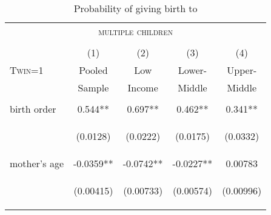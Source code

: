 \documentclass{article}[11pt,subeqn]
\begin{document}
\begin{spacing}{1.5}
\begin{table}[ht]
\caption{Probability of giving birth to}
\vspace{-7mm}
\label{tab:twinreg1}
\begin{center}
\begin{tabular}{lcccc} 
\multicolumn{5}{c}{\textsc{multiple children}}\\
& & \\
\toprule
 & (1) & (2) & (3) & (4) \\
\textsc{Twin=1} & Pooled & Low & Lower- & Upper- \\ 
 & Sample & Income & Middle & Middle \\  \midrule
\vspace{4pt} & \begin{footnotesize}\end{footnotesize} & \begin{footnotesize}\end{footnotesize} & \begin{footnotesize}\end{footnotesize} & \begin{footnotesize}\end{footnotesize} \\
birth order & 0.544** & 0.697** & 0.462** & 0.341** \\
\vspace{4pt} & \begin{footnotesize}(0.0128)\end{footnotesize} & \begin{footnotesize}(0.0222)\end{footnotesize} & \begin{footnotesize}(0.0175)\end{footnotesize} & \begin{footnotesize}(0.0332)\end{footnotesize} \\
mother's age & -0.0359** & -0.0742** & -0.0227** & 0.00783 \\
\vspace{4pt} & \begin{footnotesize}(0.00415)\end{footnotesize} & \begin{footnotesize}(0.00733)\end{footnotesize} & \begin{footnotesize}(0.00574)\end{footnotesize} & \begin{footnotesize}(0.00996)\end{footnotesize} \\

\end{tabular}
\end{center}
\end{table}
\end{spacing}
\end{document}
